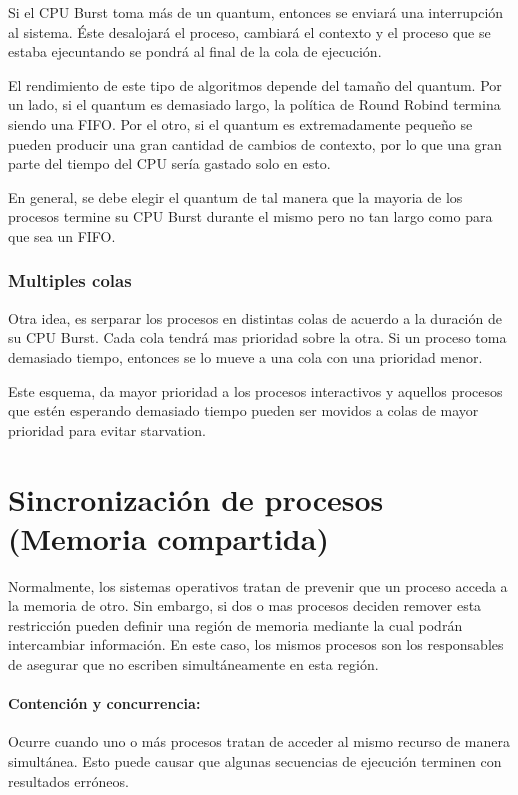     Si el CPU Burst toma más de un quantum, entonces se enviará una interrupción al sistema. Éste desalojará el proceso, cambiará el contexto y el proceso que se estaba ejecuntando se pondrá al final de la cola de ejecución.
    
    El rendimiento de este tipo de algoritmos depende del tamaño del quantum. Por un lado, si el quantum es demasiado largo, la política de Round Robind termina siendo una FIFO. Por el otro, si el quantum es extremadamente pequeño se pueden producir una gran cantidad de cambios de contexto, por lo que una gran parte del tiempo del CPU sería gastado solo en esto.
    
    En general, se debe elegir el quantum de tal manera que la mayoria de los procesos termine su CPU Burst durante el mismo pero no tan largo como para que sea un FIFO.
    
    \subsubsection{Multiples colas}
    Otra idea, es serparar los procesos en distintas colas de acuerdo a la duración de su CPU Burst. Cada cola tendrá mas prioridad sobre la otra. Si un proceso toma demasiado tiempo, entonces se lo mueve a una cola con una prioridad menor. 
    
    Este esquema, da mayor prioridad a los procesos interactivos y aquellos procesos que estén esperando demasiado tiempo pueden ser movidos a colas de mayor prioridad para evitar starvation.

\printbibliography[keyword=scheduling,title=Bibliografía]

\newpage
\section{Sincronización de procesos (Memoria compartida)}
Normalmente, los sistemas operativos tratan de prevenir que un proceso acceda a la memoria de otro. Sin embargo, si dos o mas procesos deciden remover esta restricción pueden definir una región de memoria mediante la cual podrán intercambiar información. En este caso, los mismos procesos son los responsables de asegurar que no escriben simultáneamente en esta región.

\paragraph{Contención y concurrencia:} Ocurre cuando uno o más procesos tratan de acceder al mismo recurso de manera simultánea. Esto puede causar que algunas secuencias de ejecución terminen con resultados erróneos.

